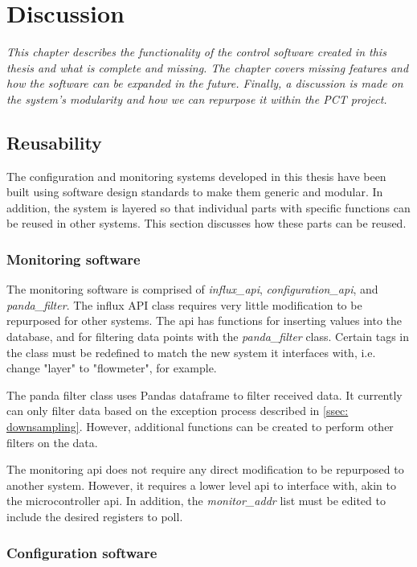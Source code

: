 \documentclass[main.tex]{subfiles}
\begin{document}
\section{Discussion}
\textit{This chapter describes the functionality of the control software created in this thesis and what is complete and missing. The chapter covers missing features and how the software can be expanded in the future. Finally, a discussion is made on the system's modularity and how we can repurpose it within the PCT project.}

\subsection{Reusability}
 
The configuration and monitoring systems developed in this thesis have been built using software design standards to make them generic and modular. In addition, the system is layered so that individual parts with specific functions can be reused in other systems. This section discusses how these parts can be reused.
 
 \subsubsection{Monitoring software}
The monitoring software is comprised of \textit{influx\_api}, \textit{configuration\_api}, and \textit{panda\_filter}. The influx API class requires very little modification to be repurposed for other systems. The \gls{api} has functions for inserting values into the database, and for filtering data points with the \textit{panda\_filter} class. Certain tags in the class must be redefined to match the new system it interfaces with, i.e. change "layer" to "flowmeter", for example.

The panda filter class uses Pandas dataframe to filter received data. It currently can only filter data based on the exception process described in \autoref{ssec: downsampling}. However, additional functions can be created to perform other filters on the data.

The monitoring \gls{api} does not require any direct modification to be repurposed to another system. However, it requires a lower level \gls{api} to interface with, akin to the microcontroller \gls{api}. In addition, the \textit{monitor\_addr} list must be edited to include the desired registers to poll.

\subsubsection{Configuration software}
\end{document}
